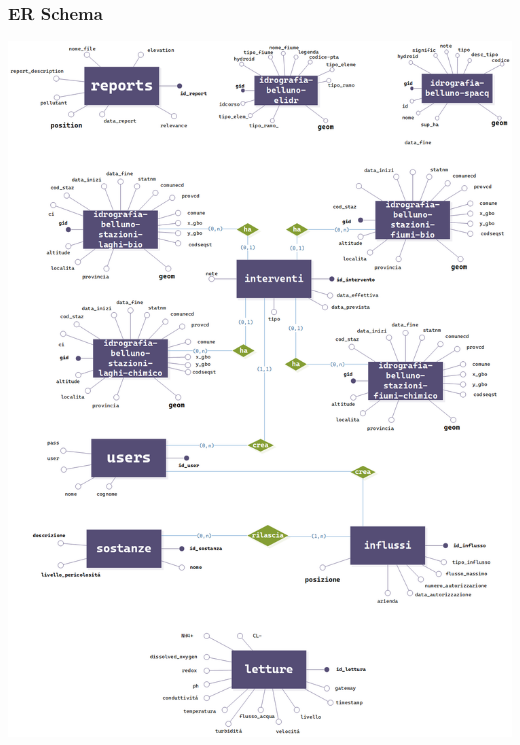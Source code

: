 \subsubsection{ER Schema}
\begin{center} \includegraphics[width=\textwidth]{img/ERSchema.png} \label{er} \end{center}


